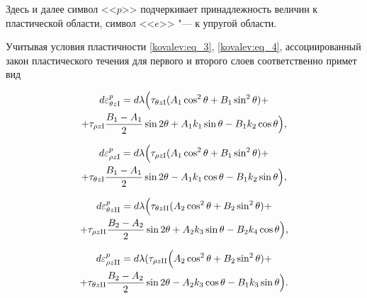  Здесь и далее символ <<$p$>> подчеркивает принадлежность величин к пластической области, символ <<$e$>> "--- к упругой области.



Учитывая условия пластичности \eqref{kovalev:eq_3}, \eqref{kovalev:eq_4}, ассоциированный закон пластического течения для первого и второго слоев соответственно примет вид

 \begin{multline}

\label{kovalev:eq_9}

   d\varepsilon_{\theta z\mathrm{I}}^p= d\lambda \Bigl(\tau_{\theta z\mathrm{I}}   (A_1\cos^2\theta+B_1\sin^2\theta )+\\

   +\tau_{\rho z\mathrm{I}}\dfrac{B_1-A_1}{2}\sin2\theta+

   A_1k_1\sin\theta-B_1k_2\cos\theta \Bigr),

 \end{multline}

 \begin{multline}

\label{kovalev:eq_10}

   d\varepsilon_{\rho z\mathrm{I}}^p= d\lambda \Bigl(\tau_{\rho z\mathrm{I}}   (A_1\cos^2\theta+B_1\sin^2\theta )+\\

   +\tau_{\theta z\mathrm{I}}\dfrac{B_1-A_1}{2}\sin2\theta-

   A_1k_1\cos\theta-B_1k_2\sin\theta \Bigr),

 \end{multline}

 \begin{multline}

\label{kovalev:eq_11}

   d\varepsilon_{\theta z\mathrm{II}}^p= d\lambda \Bigl(\tau_{\theta z\mathrm{II}}   (A_2\cos^2\theta+B_2\sin^2\theta )+\\

   +\tau_{\rho z\mathrm{II}}\dfrac{B_2-A_2}{2}\sin2\theta+

   A_2k_3\sin\theta-B_2k_4\cos\theta \Bigr),

 \end{multline}

 \begin{multline}\label{kovalev:eq_12}

   d\varepsilon_{\rho z\mathrm{II}}^p= d\lambda (\tau_{\rho z\mathrm{II}}   \Bigl(A_2\cos^2\theta+B_2\sin^2\theta )+\\

   +\tau_{\theta z\mathrm{II}}\dfrac{B_2-A_2}{2}\sin2\theta-

   A_2k_3\cos\theta-B_1k_3\sin\theta \Bigr).

  \end{multline}

